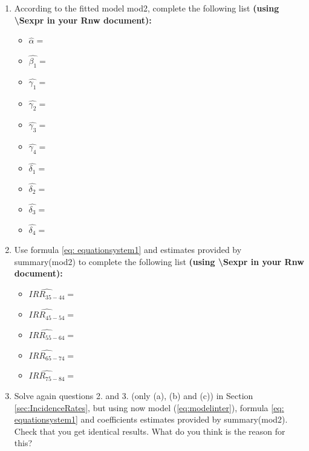 \documentclass[10pt,a4paper,twoside]{article}\usepackage[]{graphicx}\usepackage[]{xcolor}
\begin{document}
\begin{enumerate}
According to the p-value = 0.0164 < 0.05, we reject the null hypothesis. Accordingly, from now on, we discard model (\ref{eq:modelmain}) and \textbf{continue the exercise using model} (\ref{eq:modelinter}) (\textbf{i.e., the fitted model} mod2). As a consequence, we are assuming that age is an
effect modifier.

\item According to the fitted model mod2, complete the following list \textbf{(using \textbackslash{Sexpr} in your Rnw document):}
\begin{itemize}
    \item $\hat{\alpha}=$
    \item $\hat{\beta_{1}} =$
    \item $\hat{\gamma_{1}} =$
    \item $\hat{\gamma_{2}}=$
    \item $\hat{\gamma_{3}}=$
    \item $\hat{\gamma_{4}}=$
    \item $\hat{\delta_{1}}=$
    \item $\hat{\delta_{2}}=$
    \item $\hat{\delta_{3}}=$
    \item $\hat{\delta_{4}}=$
\end{itemize}
    \item Use formula \ref{eq: equationsystem1} and estimates provided by summary(mod2) to complete the following list \textbf{(using \textbackslash{Sexpr} in your Rnw document):}
    \begin{itemize}
        \item $\widehat{IRR_{35-44}} =$
        \item $\widehat{IRR_{45-54}}=$
        \item $\widehat{IRR_{55-64}}=$
        \item $\widehat{IRR_{65-74}} =$
        \item $\widehat{IRR_{75-84}} =$
    \end{itemize}
\item Solve again questions 2. and 3. (only (a), (b) and (c)) in Section \ref{sec:IncidenceRates}, but using now
model (\ref{eq:modelinter}), formula \ref{eq: equationsystem1} and coefficients estimates provided by summary(mod2). Check that you get identical results. What do you think is the reason for this?


\end{enumerate}

\end{document}

